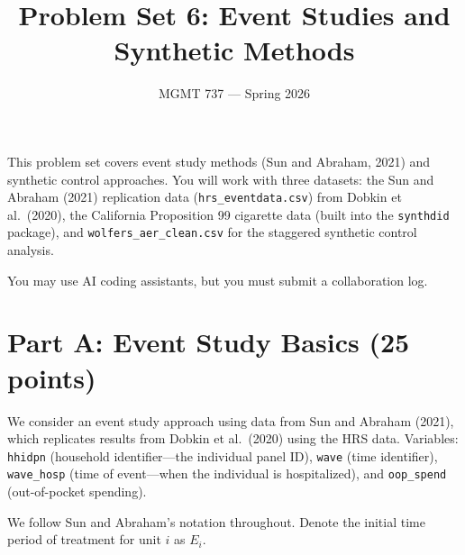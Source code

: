 \documentclass[11pt]{article}
\title{Problem Set 6: Event Studies and Synthetic Methods}
\author{MGMT 737 --- Spring 2026}
\date{}
\begin{document}
\maketitle

This problem set covers event study methods (Sun and Abraham, 2021) and synthetic control approaches. You will work with three datasets: the Sun and Abraham (2021) replication data (\texttt{hrs\_eventdata.csv}) from Dobkin et al.\ (2020), the California Proposition 99 cigarette data (built into the \texttt{synthdid} package), and \texttt{wolfers\_aer\_clean.csv} for the staggered synthetic control analysis.

You may use AI coding assistants, but you must submit a collaboration log.

\section*{Part A: Event Study Basics (25 points)}

We consider an event study approach using data from Sun and Abraham (2021), which replicates results from Dobkin et al.\ (2020) using the HRS data. Variables: \texttt{hhidpn} (household identifier---the individual panel ID), \texttt{wave} (time identifier), \texttt{wave\_hosp} (time of event---when the individual is hospitalized), and \texttt{oop\_spend} (out-of-pocket spending).

We follow Sun and Abraham's notation throughout. Denote the initial time period of treatment for unit $i$ as $E_i$.
\end{document}
